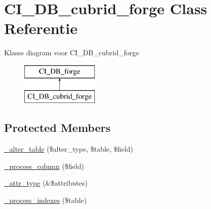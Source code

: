 \hypertarget{class_c_i___d_b__cubrid__forge}{}\section{C\+I\+\_\+\+D\+B\+\_\+cubrid\+\_\+forge Class Referentie}
\label{class_c_i___d_b__cubrid__forge}
Klasse diagram voor C\+I\+\_\+\+D\+B\+\_\+cubrid\+\_\+forge\begin{figure}[H]
\begin{center}
\leavevmode
\includegraphics[height=2.000000cm]{class_c_i___d_b__cubrid__forge}
\end{center}
\end{figure}
\subsection*{Protected Members}
\begin{DoxyCompactItemize}
\item 
\mbox{\hyperlink{class_c_i___d_b__cubrid__forge_a41c6cae02f2fda8b429ad0afb9509426}{\+\_\+alter\+\_\+table}} (\$alter\+\_\+type, \$table, \$field)
\item 
\mbox{\hyperlink{class_c_i___d_b__cubrid__forge_a8f38f1c5b5dddecca4befbe393f3f299}{\+\_\+process\+\_\+column}} (\$field)
\item 
\mbox{\hyperlink{class_c_i___d_b__cubrid__forge_a8553be952084c6f7cdfff370a1d14f6b}{\+\_\+attr\+\_\+type}} (\&\$attributes)
\item 
\mbox{\hyperlink{class_c_i___d_b__cubrid__forge_ae0bdb4ea3418590d1894c5b621b5ca50}{\+\_\+process\+\_\+indexes}} (\$table)
\end{DoxyCompactItemize}
